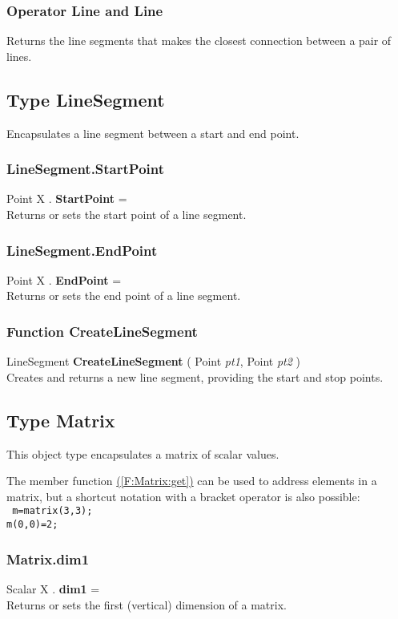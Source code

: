 \documentclass[10pt]{book}
\newcommand{\linkitem}[1]{\hyperref[#1]{\nameref{#1} (\ref{#1})}}
\newcommand{\sourcecode}[1]{\texttt{#1}}
\begin{document}
\subsubsection{Operator Line  and  Line \label{O:Line and Line}}
Returns the line segments that makes the closest connection between a pair of lines.

\subsection{Type LineSegment \label{T:LineSegment}}
Encapsulates a line segment between a start and end point.

\subsubsection{LineSegment.StartPoint \label{F:LineSegment:StartPoint}}
Point X . \textbf{StartPoint} = \\
Returns or sets the start point of a line segment.

\subsubsection{LineSegment.EndPoint \label{F:LineSegment:EndPoint}}
Point X . \textbf{EndPoint} = \\
Returns or sets the end point of a line segment.

\subsubsection{Function CreateLineSegment \label{F:CreateLineSegment}}
LineSegment \textbf{CreateLineSegment} ( Point \textit{pt1}, Point \textit{pt2} ) \\
Creates and returns a new line segment, providing the start and stop points.

\subsection{Type Matrix \label{T:Matrix}}
This object type encapsulates a matrix of scalar values.

The member function \linkitem{F:Matrix:get} can be used to address elements in a matrix, but a shortcut notation with a bracket operator is also possible: \\
\sourcecode{
m=matrix(3,3); \\
m(0,0)=2; \\
}

\subsubsection{Matrix.dim1 \label{F:Matrix:dim1}}
Scalar X . \textbf{dim1} = \\
Returns or sets the first (vertical) dimension of a matrix.
\end{document}
